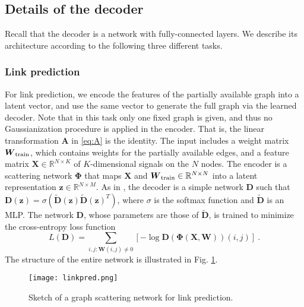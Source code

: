 \documentclass[conference]{IEEEtran}
\def\RR{\mathbb{R}}
\def\BA{\boldsymbol{A}}
\def\BD{\boldsymbol{D}}
\def\BW{\boldsymbol{W}}
\def\BX{\boldsymbol{X}}
\def\Bz{\boldsymbol{z}}
\def\BPhi{\boldsymbol{\Phi}}
\begin{document}
\subsection{Details of the decoder}
\label{sec:graph_scat_decode}
Recall that the decoder is a network with fully-connected layers. We describe its architecture according to the following three different tasks.  

\subsubsection{Link prediction}\label{subsec:theolinkpred}
For link prediction, we encode the features of the partially available graph into a latent vector, and use the same vector to generate the full graph via the learned decoder. Note that in this task only one fixed graph is given, and thus no Gaussianization procedure is applied in the encoder. That is, the linear transformation $\BA$ in \eqref{eq:A} is the identity. The input includes a weight matrix $\BW_{\textup{train}}$, which contains weights for the partially available edges, and a feature matrix $\BX \in \RR^{N \times K}$ of $K$-dimensional signals on the $N$ nodes. The encoder is a scattering network $\BPhi$ that maps $\BX$ and $\BW_{\textup{train}} \in \RR^{N \times N}$ into a latent representation $\Bz \in \RR^{N \times M}$. As in \cite{kipf2016variational}, the decoder is a simple network $\BD$ such that $\BD(\Bz) = \sigma(\tilde{\BD}(\Bz) \tilde{\BD}(\Bz)^T)$, where $\sigma$ is the softmax function 
and $\tilde{\BD}$ is an MLP. The network $\BD$, whose parameters are those of $\tilde{\BD}$, is trained to minimize the 
cross-entropy loss function 
\begin{equation}\label{eq:crossentropylink}
    L(\BD) = \sum_{i, j: \BW(i,j) \neq 0} [- \log \BD(\BPhi(\BX,\BW)) (i,j)] ~.
\end{equation}
The structure of the entire network is illustrated in Fig. \ref{fig:linkpred}.

\begin{figure}[t]
    \centering
    \texttt{[image: linkpred.png]}
    \caption{Sketch of a graph scattering network for link prediction.} 
    \label{fig:linkpred}
\end{figure}
\end{document}
